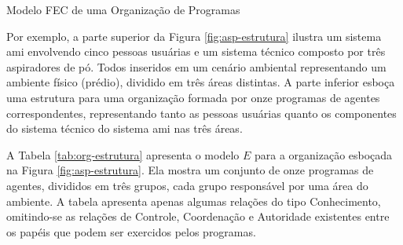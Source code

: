 \begin{section}{Modelo FEC de uma Organização de Programas}
\begin{itemize}
        
    \end{itemize}
    
    Por exemplo, a parte superior da Figura \ref{fig:asp-estrutura} ilustra um sistema \acrshort{ami} envolvendo cinco pessoas usuárias e um sistema técnico composto por três aspiradores de pó. Todos inseridos em um cenário ambiental representando um ambiente físico (prédio), dividido em três áreas distintas. A parte inferior esboça uma estrutura para uma organização formada por onze programas de agentes correspondentes, representando tanto as pessoas usuárias quanto os componentes do sistema técnico do sistema \acrshort{ami} nas três áreas.
    
    \begin{figure}[h!]
        \centering
    \end{figure}
    \clearpage
    A Tabela \ref{tab:org-estrutura} apresenta o modelo $E$ para a organização esboçada na Figura \ref{fig:asp-estrutura}. Ela mostra um conjunto de onze programas de agentes, divididos em três grupos, cada grupo responsável por uma área do ambiente. A tabela apresenta apenas algumas relações do tipo Conhecimento, omitindo-se as relações de Controle, Coordenação e Autoridade existentes entre os papéis que podem ser exercidos pelos programas.
    
    \begin{table}[h!]   
        \centering
\end{table}
\end{section}
